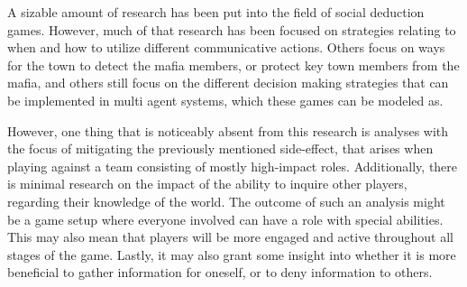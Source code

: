 A sizable amount of research has been put into the field of social deduction
games. However, much of that research has been focused on strategies relating
to when and how to utilize different communicative actions\cite{commitment}.
Others focus on ways for the town to detect the mafia
members\cite{werewolf_stealth}, or protect key town members from the
mafia\cite{werewolf_nash_equilibrium}, and others still focus on the different
decision making strategies that can be implemented in multi agent systems,
which these games can be modeled
as\cite{modelling_multi_agent_epistemic_systems}\cite{multi_agent_epistemic_planner_common_knowledge}\cite{probibalistic_multiagent_systems}.

However, one thing that is noticeably absent from this research is analyses
with the focus of mitigating the previously mentioned side-effect, that arises
when playing against a team consisting of mostly high-impact roles.
Additionally, there is minimal research on the impact of the ability to inquire
other players, regarding their knowledge of the world. The outcome of such an
analysis might be a game setup where everyone involved can have a role with
special abilities. This may also mean that players will be more engaged and
active throughout all stages of the game. Lastly, it may also grant some
insight into whether it is more beneficial to gather information for oneself,
or to deny information to others.